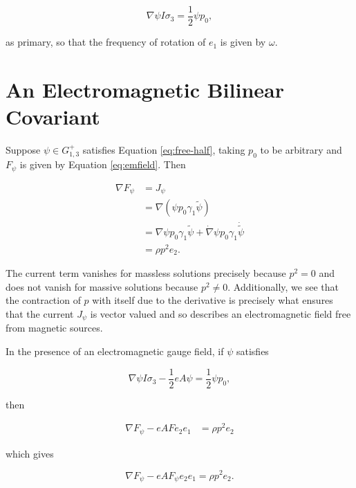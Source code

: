 \documentclass{article}
\begin{document}
    \begin{equation}
      \nabla \psi I \sigma_3 = \frac{1}{2} \psi p_0,\label{eq:free-half}
    \end{equation}

    as primary, so that the frequency of rotation of $e_1$ is given by $\omega$.

    \section{An Electromagnetic Bilinear Covariant}\label{electromagnetism}

    Suppose $\psi \in G_{1,3}^+$ satisfies Equation \ref{eq:free-half}, taking $p_0$ to be arbitrary and $F_\psi$ is given by Equation \ref{eq:emfield}. Then

    \begin{align}
      \nabla F_\psi &= J_\psi\\
      &= \nabla (\psi p_0 \gamma_1 \widetilde \psi)\\
      &= \nabla \psi p_0 \gamma_1 \widetilde \psi + \dot \nabla \psi p_0 \gamma_1 \dot{\widetilde \psi} \\
      &= \rho p^2 e_2.
    \end{align}

    The current term vanishes for massless solutions precisely because $p^2 = 0$ and does not vanish for massive solutions because $p^2 \not= 0$. Additionally, we see that the contraction of $p$ with itself due to the derivative is precisely what ensures that the current $J_\psi$ is vector valued and so describes an electromagnetic field free from magnetic sources.

    In the presence of an electromagnetic gauge field, if $\psi$ satisfies

    \begin{equation}
      \nabla \psi I \sigma_3 - \frac{1}{2} e A \psi = \frac{1}{2} \psi p_0,
    \end{equation}

    then

    \begin{align}
      \nabla F_\psi - e A F e_2 e_1
      &= \rho p^2 e_2
    \end{align}

    which gives

    \begin{equation}
      \nabla F_\psi - e A F_\psi e_2e_1 = \rho p^2 e_2.\label{eq:gaugedem}
    \end{equation}
\end{document}
